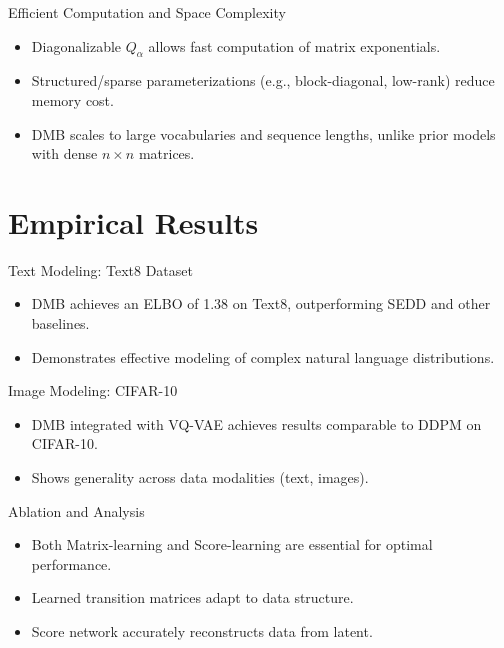 \documentclass{beamer}
\begin{document}
\begin{frame}{Efficient Computation and Space Complexity}
  \begin{itemize}
    \item Diagonalizable $Q_\alpha$ allows fast computation of matrix exponentials.
    \item Structured/sparse parameterizations (e.g., block-diagonal, low-rank) reduce memory cost.
    \item DMB scales to large vocabularies and sequence lengths, unlike prior models with dense $n \times n$ matrices.
  \end{itemize}
\end{frame}

\section{Empirical Results}

\begin{frame}{Text Modeling: Text8 Dataset}
  \begin{itemize}
    \item DMB achieves an ELBO of 1.38 on Text8, outperforming SEDD and other baselines.
    \item Demonstrates effective modeling of complex natural language distributions.
  \end{itemize}
\end{frame}

\begin{frame}{Image Modeling: CIFAR-10}
  \begin{itemize}
    \item DMB integrated with VQ-VAE achieves results comparable to DDPM on CIFAR-10.
    \item Shows generality across data modalities (text, images).
  \end{itemize}
\end{frame}

\begin{frame}{Ablation and Analysis}
  \begin{itemize}
    \item Both Matrix-learning and Score-learning are essential for optimal performance.
    \item Learned transition matrices adapt to data structure.
    \item Score network accurately reconstructs data from latent.
  \end{itemize}
\end{frame}
\end{document}
